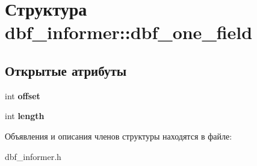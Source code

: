 \hypertarget{structdbf__informer_1_1dbf__one__field}{\section{Структура dbf\-\_\-informer\-:\-:dbf\-\_\-one\-\_\-field}
\label{structdbf__informer_1_1dbf__one__field}
}
\subsection*{Открытые атрибуты}
\begin{DoxyCompactItemize}
\item 
\hypertarget{structdbf__informer_1_1dbf__one__field_ab3d39db3c6416ff8c048833932b2160b}{int {\bfseries offset}}\label{structdbf__informer_1_1dbf__one__field_ab3d39db3c6416ff8c048833932b2160b}

\item 
\hypertarget{structdbf__informer_1_1dbf__one__field_afc821f5465b8ce01c94e8a649276dc65}{int {\bfseries length}}\label{structdbf__informer_1_1dbf__one__field_afc821f5465b8ce01c94e8a649276dc65}

\end{DoxyCompactItemize}


Объявления и описания членов структуры находятся в файле\-:\begin{DoxyCompactItemize}
\item 
dbf\-\_\-informer.\-h\end{DoxyCompactItemize}
